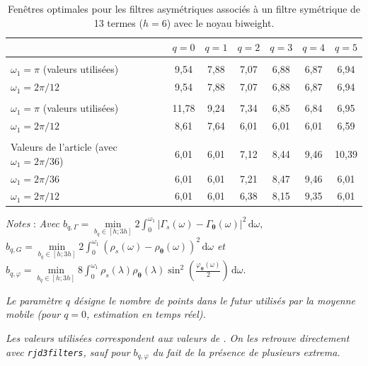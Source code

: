 \documentclass[
  12pt,
  a4paper,french]{article}
\newcommand\1{\mathds{1}}
\newcommand\ud{\,\mathrm{d}}
\begin{document}
\begin{table}[!h]

\caption{\label{tab:optimalbwrkhs}Fenêtres optimales pour les filtres asymétriques associés à un filtre symétrique de 13 termes ($h=6$) avec le noyau biweight.}
{
\centering
\begin{tabular}[t]{lcccccc}
\toprule
  & $q=0$ & $q=1$ & $q=2$ & $q=3$ & $q=4$ & $q=5$\\
\midrule
\addlinespace[0.3em]
\multicolumn{7}{l}{\textbf{$b_{q,\Gamma}$}}\\
\hspace{1em}$\omega_1 = \pi$ (valeurs utilisées) & 9,54 & 7,88 & 7,07 & 6,88 & 6,87 & 6,94\\
\hspace{1em}$\omega_1 = 2\pi/12$ & 9,54 & 7,88 & 7,07 & 6,88 & 6,87 & 6,94\\
\addlinespace[0.3em]
\multicolumn{7}{l}{\textbf{$b_{q,G}$}}\\
\hspace{1em}$\omega_1 = \pi$ (valeurs utilisées) & 11,78 & 9,24 & 7,34 & 6,85 & 6,84 & 6,95\\
\hspace{1em}$\omega_1 = 2\pi/12$ & 8,61 & 7,64 & 6,01 & 6,01 & 6,01 & 6,59\\
\addlinespace[0.3em]
\multicolumn{7}{l}{\textbf{$b_{q,\varphi}$}}\\
\hspace{1em}Valeurs de l'article (avec $\omega_1 = 2\pi/36$) & 6,01 & 6,01 & 7,12 & 8,44 & 9,46 & 10,39\\
\hspace{1em}$\omega_1 = 2\pi/36$ & 6,01 & 6,01 & 7,21 & 8,47 & 9,46 & 6,01\\
\hspace{1em}$\omega_1 = 2\pi/12$ & 6,01 & 6,01 & 6,38 & 8,15 & 9,35 & 6,01\\
\bottomrule
\end{tabular}
}
\footnotesize


\emph{Notes} : \emph{Avec \(b_{q,\Gamma}=\underset{b_q\in[h; 3h]}{\min}2\int_{0}^{\omega_1}\lvert \Gamma_s(\omega)-\Gamma_{\boldsymbol\theta}(\omega)\rvert^2\ud \omega,\) \(b_{q,G}=\underset{b_q\in[h; 3h]}{\min}2\int_{0}^{\omega_1}\left(\rho_s(\omega)-\rho_{\boldsymbol\theta}(\omega)\right)^{2} \ud \omega\) et \(b_{q,\varphi}=\underset{b_q\in[h; 3h]}{\min}8\int_{0}^{\omega_1}\rho_s(\lambda)\rho_{\boldsymbol\theta}(\lambda)\sin^{2}\left(\frac{\varphi_{\boldsymbol\theta}(\omega)}{2}\right)\ud \omega.\)}

\emph{Le paramètre \(q\) désigne le nombre de points dans le futur utilisés par la moyenne mobile (pour \(q=0\), estimation en temps réel).}

\emph{Les valeurs utilisées correspondent aux valeurs de \textcite{dagumbianconcini2015new}. On les retrouve directement avec \texttt{rjd3filters}, sauf pour \(b_{q,\varphi}\) du fait de la présence de plusieurs extrema.}
\normalsize\end{table}
\end{document}

